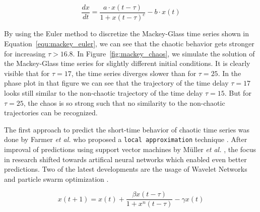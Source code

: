 \begin{equation}
    \frac{dx}{dt} = \frac{a \cdot x(t - \tau)}{1 + x(t - \tau)^c} - b \cdot x(t)
    \label{equ:mackey}
\end{equation}

By using the Euler method to discretize the Mackey-Glass time series shown in 
Equation~\ref{equ:mackey_euler}, we can
see that the chaotic behavior gets stronger for increasing $\tau > 16.8$. In
Figure~\ref{fig:mackey_chaos}, we simulate the solution of the Mackey-Glass
time series for slightly different initial conditions. It is clearly visible
that for $\tau = 17$, the time series diverges slower than for $\tau = 25$. In 
the phase plot in that figure we can see that the trajectory of the time delay 
$\tau = 17$ looks still similar to the non-chaotic trajectory of the time delay
$\tau = 15$. But for $\tau=25$, the chaos is so strong such that no similarity 
to the non-chaotic trajectories can be recognized.

The first approach to predict the short-time behavior of chaotic time series
was done by Farmer \textit{et al.} who proposed a \texttt{local approximation}
technique \cite{farmer1987}. After improval of predictions using support vector
machines by Müller \textit{et al.} \cite{muller1997}, the focus in research
shifted towards artifical neural networks which enabled even better predictions.
Two of the latest developments are the usage of Wavelet Networks
\cite{alexandridis2013} and particle swarm optimization \cite{lopez2016}.

\begin{equation}
    x(t+1) = x(t) + \frac{\beta x(t - \tau)}{1 + x^{n}(t - \tau)} - \gamma x(t)
    \label{equ:mackey_euler}
\end{equation}

